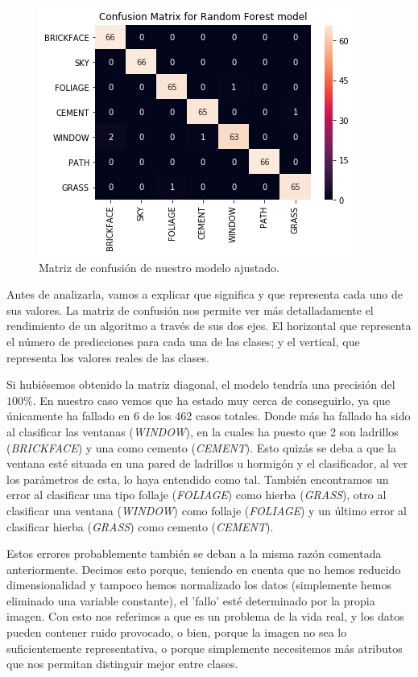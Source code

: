\documentclass[11pt,a4paper]{article}
\begin{document}
\begin{figure}[H]
    \centering
    \includegraphics[scale=0.7]{img/confusion-matrix.png}
    \caption{Matriz de confusión de nuestro modelo ajustado.}
    \label{fig:confusion-matrix}
\end{figure}

Antes de analizarla, vamos a explicar que significa y que representa cada uno de sus valores. La matriz de confusión nos permite ver más detalladamente el rendimiento de un algoritmo a través de sus dos ejes. El horizontal que representa el número de predicciones para cada una de las clases; y el vertical, que representa los valores reales de las clases.

Si hubiésemos obtenido la matriz diagonal, el modelo tendría una precisión del $100\%$. En nuestro caso vemos que ha estado muy cerca de conseguirlo, ya que únicamente ha fallado en 6 de los 462 casos totales. Donde más ha fallado ha sido al clasificar las ventanas (\textit{WINDOW}), en la cuales ha puesto que 2 son ladrillos (\textit{BRICKFACE}) y una como cemento (\textit{CEMENT}). Esto quizás se deba a que la ventana esté situada en una pared de ladrillos u hormigón y el clasificador, al ver los parámetros de esta, lo haya entendido como tal. También encontramos un error al clasificar una tipo follaje (\textit{FOLIAGE}) como hierba (\textit{GRASS}), otro al clasificar una ventana (\textit{WINDOW}) como follaje (\textit{FOLIAGE}) y un último error al clasificar hierba (\textit{GRASS}) como cemento (\textit{CEMENT}).

Estos errores probablemente también se deban a la misma razón comentada anteriormente. Decimos esto porque, teniendo en cuenta que no hemos reducido dimensionalidad y tampoco hemos normalizado los datos (simplemente hemos eliminado una variable constante), el 'fallo' esté determinado por la propia imagen. Con esto nos referimos a que es un problema de la vida real, y los datos pueden contener ruido provocado, o bien, porque la imagen no sea lo suficientemente representativa, o porque simplemente necesitemos más atributos que nos permitan distinguir mejor entre clases.
\end{document}
